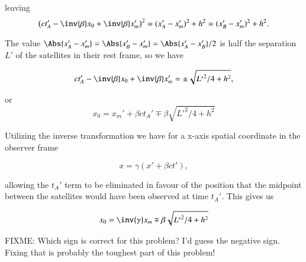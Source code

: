 leaving
\begin{equation}\label{eqn:relElectroDynProblemSet2:1400}
\left( c t_A' -\inv{\beta} x_0 + \inv{\beta} x_m' \right)^2 = (x_A' - x_m')^2 + h^2 = (x_B' - x_m')^2 + h^2.
\end{equation}

The value $\Abs{x_A' - x_m'} = \Abs{x_B' - x_m'} = \Abs{x_A' - x_B'}/2$ is half the separation $L'$ of the satellites in their rest frame, so we have

\begin{equation}\label{eqn:relElectroDynProblemSet2:1420}
c t_A' -\inv{\beta} x_0 + \inv{\beta} x_m' = \pm \sqrt{{L'}^2/4 + h^2},
\end{equation}

or
\begin{equation}\label{eqn:relElectroDynProblemSet2:1440}
x_0 = x_m' + \beta c t_A' \mp \beta \sqrt{{L'}^2/4 + h^2} 
\end{equation}

Utilizing the inverse transformation we have for a x-axis spatial coordinate in the observer frame

\begin{equation}\label{eqn:relElectroDynProblemSet2:1460}
x = \gamma ( x' + \beta c t'),
\end{equation}

allowing the $t_A'$ term to be eliminated in favour of the position that the midpoint between the satellites would have been observed at time $t_A'$.  This gives us

\begin{equation}\label{eqn:relElectroDynProblemSet2:1480}
x_0 = \inv{\gamma} x_m \mp \beta \sqrt{{L'}^2/4 + h^2} 
\end{equation}

FIXME: Which sign is correct for this problem?  I'd guess the negative sign.  Fixing that is probably the toughest part of this problem!

\EndArticle
